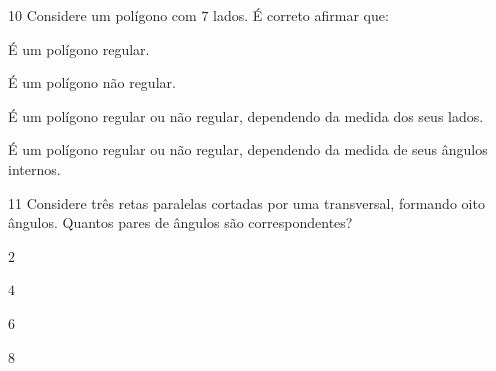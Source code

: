 
\num{10} Considere um polígono com $7$ lados. É correto afirmar que:

\begin{escolha}
\item É um polígono regular.
\item É um polígono não regular.
\item É um polígono regular ou não regular, dependendo da medida dos seus
lados.
\item É um polígono regular ou não regular, dependendo da medida de seus
ângulos internos.
\end{escolha}



\num{11} Considere três retas paralelas cortadas por uma transversal,
formando oito ângulos. Quantos pares de ângulos são correspondentes?

\begin{escolha}
\item $2$
\item $4$
\item $6$
\item $8$
\end{escolha}

